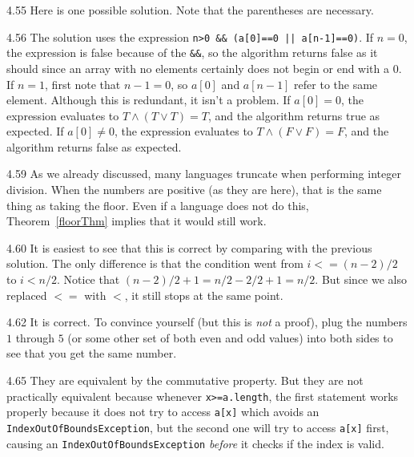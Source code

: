 \begin{Answer}{4.55}
Here is one possible solution.  Note that the parentheses are necessary.
\begin{code}
    boolean startsOrEndsWithZero(int[] a, int n) {
        if( n>0 && (a[0]==0 || a[n-1]==0) ) {
            return true;
        else {
            return false;
        }
    }
\end{code}
\end{Answer}
\begin{Answer}{4.56}
The solution uses the expression  \verb+n>0 && (a[0]==0 || a[n-1]==0)+.
If $n=0$, the expression is false because of the \verb+&&+, so the algorithm returns false as it should
since an array with no elements certainly does not begin or end with a $0$.
If $n=1$, first note that $n-1=0$, so $a[0]$ and $a[n-1]$ refer to the same element.
Although this is redundant, it isn't a problem.
If $a[0]=0$, the expression evaluates to $T\wedge (T\vee T)=T$, and the algorithm returns
true as expected.
If $a[0]\neq 0$, the expression evaluates to $T\wedge (F\vee F)=F$, and the algorithm returns
false as expected.
\end{Answer}
\begin{Answer}{4.59}
As we already discussed, many languages truncate when performing integer division.
When the numbers are positive (as they are here), that is the same thing as taking the floor.
Even if a language does not do this, Theorem~\ref{floorThm} implies that it would still work.
\end{Answer}
\begin{Answer}{4.60}
It is easiest to see that this is correct by comparing with the previous solution.
The only difference is that the condition went from $i<=(n-2)/2$ to $i<n/2$.
Notice that $(n-2)/2+1=n/2-2/2+1=n/2$.
But since we also replaced $<=$ with $<$, it still stops at the same point.
\end{Answer}
\begin{Answer}{4.62}
It is correct.  To convince yourself (but this is {\em not} a proof),
plug the numbers $1$ through $5$ (or some other set of both even and odd values) into both sides
to see that you get the same number.
\end{Answer}
\begin{Answer}{4.65}
They are equivalent by the commutative property.
But they are not practically equivalent because
whenever \verb+x>=a.length+, the first statement works
properly because it does not try to access \verb+a[x]+
which avoids an \verb+IndexOutOfBoundsException+,
but the second one will try to access \verb+a[x]+ first,
causing an \verb+IndexOutOfBoundsException+ {\em before}
it checks if the index is valid.
\end{Answer}
